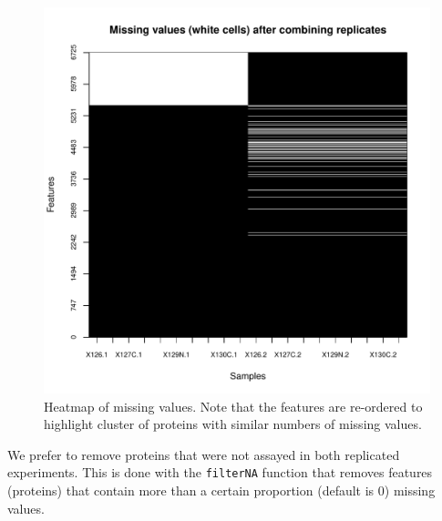 \begin{figure}[!ht]
  \centering
\begin{knitrout}
\color{fgcolor}\begin{kframe}
\begin{alltt}
\hlstd{(}  \hlstd{=} \hlstd{(}\hlstd{,} \hlstd{),}
        \hlstd{=} \hlstd{)}
\end{alltt}
\end{kframe}
\includegraphics[width=.65\textwidth]{figure/namap-1} 

\end{knitrout}
\caption{Heatmap of missing values. Note that the features are
  re-ordered to highlight cluster of proteins with similar numbers of
  missing values.}
  \label{fig:namap}
\end{figure}

We prefer to remove proteins that were not assayed in both replicated
experiments. This is done with the \texttt{filterNA} function that
removes features (proteins) that contain more than a certain proportion (default
is 0) missing values.

